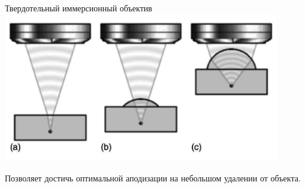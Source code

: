 \documentclass[9pt, compress, xcolor=table]{beamer}
\begin{document}
\begin{frame}{Твердотельный иммерсионный объектив}
\centering
\includegraphics[width=0.9\textwidth]{sio}

Позволяет достичь оптимальной аподизации на небольшом удалении от объекта.
\end{frame}
\end{document}
